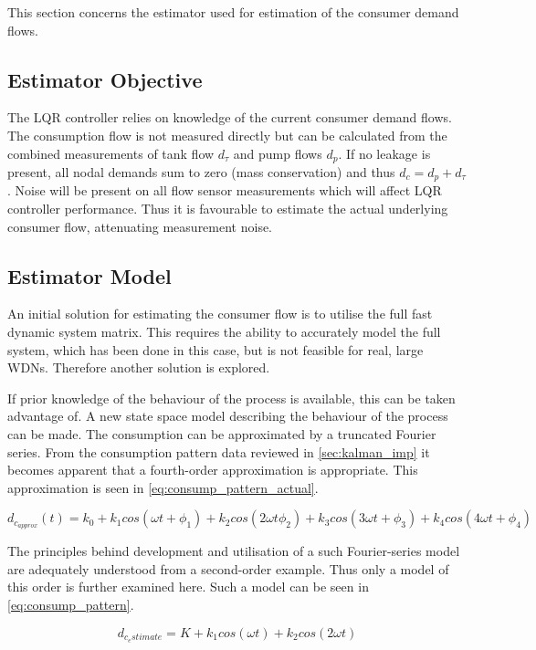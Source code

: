 This section concerns the estimator used for estimation of the consumer demand flows.

\subsection{Estimator Objective}
The LQR controller relies on knowledge of the current  consumer demand flows. The consumption flow is not measured directly but can be calculated from the combined measurements of tank flow $d_\tau$ and pump flows $d_p$. If no leakage is present, all nodal demands sum to zero (mass conservation) and thus $d_c = d_p + d_\tau$. Noise will be present on all flow sensor measurements which will affect LQR controller performance. Thus it is favourable to estimate the actual underlying consumer flow, attenuating measurement noise.

\subsection{Estimator Model}
An initial solution for estimating the consumer flow is to utilise the full fast dynamic system matrix. This requires the ability to accurately model the full system, which has been done in this case, but is not feasible for real, large WDNs. Therefore another solution is explored.

If prior knowledge of the behaviour of the process is available, this can be taken advantage of. A new state space model describing the behaviour of the process can be made. The consumption can be approximated by a truncated Fourier series. From the consumption pattern data reviewed in \cref{sec:kalman_imp} it becomes apparent that a fourth-order approximation is appropriate. This approximation is seen in \cref{eq:consump_pattern_actual}.

\begin{equation} \label{eq:consump_pattern_actual}
	d_{c_{approx}}(t) = k_0 + k_1 cos(\omega t + \phi_1) + k_2 cos(2\omega t \phi_2) + k_3 cos(3\omega t + \phi_3) + k_4 cos(4\omega t + \phi_4)
\end{equation}

The principles behind development and utilisation of a such Fourier-series model are adequately understood from a second-order example. Thus only a model of this order is further examined here. Such a model can be seen in \cref{eq:consump_pattern}. 

\begin{equation} \label{eq:consump_pattern}
	d_{c_estimate} = K + k_1 cos(\omega t) + k_2 cos(2\omega t)
\end{equation}



